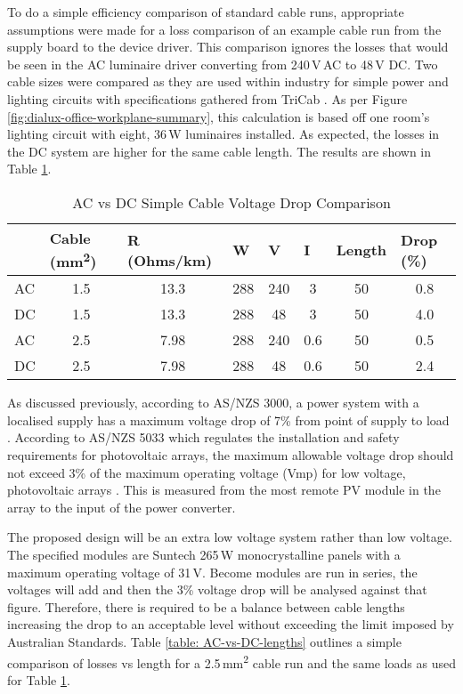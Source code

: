 To do a simple efficiency comparison of standard cable runs, appropriate assumptions were made for a loss comparison of an example cable run from the supply board to the device driver. This comparison ignores the losses that would be seen in the AC luminaire driver converting from 240\,V\,AC to 48\,V DC. Two cable sizes were compared as they are used within industry for simple power and lighting circuits with specifications gathered from TriCab \cite{website:triCAB}. As per Figure \ref{fig:dialux-office-workplane-summary}, this calculation is based off one room's lighting circuit with eight, 36\,W luminaires installed. As expected, the losses in the DC system are higher for the same cable length. The results are shown in Table \ref{table: AC-vs-DC-simple}. 

\begin{table}[H]
	\centering
	\begin{tabular}{|l|c|c|c|c|c|c|c|}
		\hline
		& \multicolumn{1}{l|}{\textbf{Cable (\si{mm^2})}} & \multicolumn{1}{l|}{\textbf{R (Ohms/km)}} & \multicolumn{1}{l|}{\textbf{W}} & \multicolumn{1}{l|}{\textbf{V}} & \multicolumn{1}{l|}{\textbf{I}} & \multicolumn{1}{l|}{\textbf{Length}} & \multicolumn{1}{l|}{\textbf{Drop (\%)}} \\ \hline
		AC & 1.5 & 13.3 & 288 & 240 & 3 & 50 & 0.8 \\ \hline
		DC & 1.5 & 13.3 & 288 & 48 & 3 & 50 & 4.0 \\ \hline
		AC & 2.5 & 7.98 & 288 & 240 & 0.6 & 50 & 0.5 \\ \hline
		DC & 2.5 & 7.98 & 288 & 48 & 0.6 & 50 & 2.4 \\ \hline
	\end{tabular}
	\caption{AC vs DC Simple Cable Voltage Drop Comparison}
	\label{table: AC-vs-DC-simple}
\end{table}  

As discussed previously, according to AS/NZS 3000, a power system with a localised supply has a maximum voltage drop of 7\% from point of supply to load \cite{StandardsAustralia2007}. According to AS/NZS 5033 which regulates the installation and safety requirements for photovoltaic arrays, the maximum allowable voltage drop should not exceed 3\% of the maximum operating voltage (Vmp) for low voltage, photovoltaic arrays \cite{StandardsAustralia2014}. This is measured from the most remote PV module in the array to the input of the power converter. 
\newline 

The proposed design will be an extra low voltage system rather than low voltage. The specified modules are Suntech 265\,W monocrystalline panels with a maximum operating voltage of 31\,V. Become modules are run in series, the voltages will add and then the 3\% voltage drop will be analysed against that figure. Therefore, there is required to be a balance between cable lengths increasing the drop to an acceptable level without exceeding the limit imposed by Australian Standards. Table \ref{table: AC-vs-DC-lengths} outlines a simple comparison of losses vs length for a 2.5\,\si{mm^2} cable run and the same loads as used for Table \ref{table: AC-vs-DC-simple}. 


